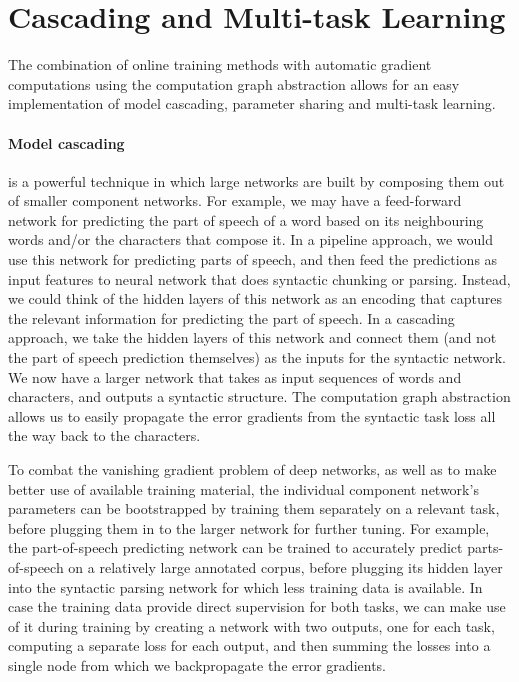 \documentclass[jair,twoside,11pt,theapa]{article}
\begin{document}
{\clearpage
\section{Cascading and Multi-task Learning}
\label{sec:joint}

The combination of online training methods with automatic gradient computations
using the computation graph abstraction allows for an easy implementation of model
cascading, parameter sharing and multi-task learning.

\paragraph{Model cascading} is a powerful technique in which large networks are built by
composing them out of smaller component networks.
For example, we may have a feed-forward network for predicting the part of
speech of a word based on its neighbouring words and/or the characters that
compose it.  In a pipeline approach, we would use this network for predicting
parts of speech, and then feed the predictions as input features to neural
network that does syntactic chunking or parsing.
Instead, we could think of the hidden layers of this network as an encoding
that captures the relevant information for predicting the part of speech.  In a
cascading approach, we take the hidden layers of this network and connect them (and
not the part of speech prediction themselves) as the inputs for the syntactic
network.  We now have a larger network that takes as input sequences of words and
characters, and outputs a syntactic structure.
The computation graph abstraction allows us to easily propagate the
error gradients from the syntactic task loss all the way back to the characters.

To combat the vanishing gradient problem of deep networks, as well as to make
better use of available training material, the individual component network's
parameters can be bootstrapped by training
them separately on a relevant task, before plugging them in to the larger network
for further tuning.  For example, the part-of-speech predicting network can be
trained to accurately predict parts-of-speech on a relatively large annotated
corpus, before plugging its hidden layer into the syntactic parsing network
for which less training data is available.  In case the training data provide
direct supervision for both tasks, we can make use of it during training by
creating a network with two outputs, one for each task, computing a separate
loss for each output, and then summing the losses into a single node from which
we backpropagate the error gradients.

}
\end{document}
